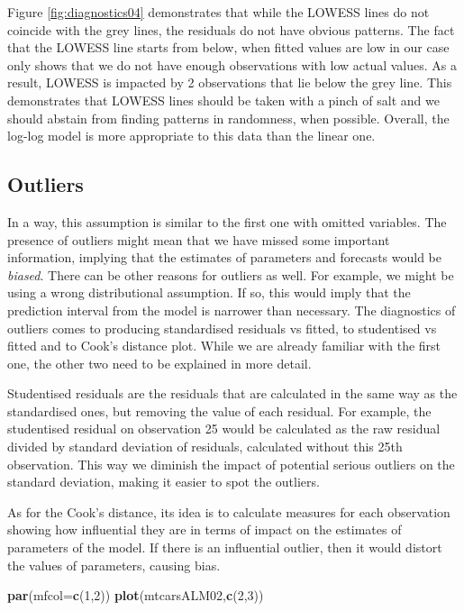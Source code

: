 \documentclass[
]{book}
\newenvironment{Shaded}{\begin{snugshade}}{\end{snugshade}}
\newcommand{\DataTypeTok}[1]{\textcolor[rgb]{0.13,0.29,0.53}{#1}}
\newcommand{\DecValTok}[1]{\textcolor[rgb]{0.00,0.00,0.81}{#1}}
\newcommand{\KeywordTok}[1]{\textcolor[rgb]{0.13,0.29,0.53}{\textbf{#1}}}
\newcommand{\NormalTok}[1]{#1}
\theoremstyle{definition}
\theoremstyle{definition}
\theoremstyle{definition}
\theoremstyle{definition}
\theoremstyle{remark}
\begin{document}
Figure \ref{fig:diagnostics04} demonstrates that while the LOWESS lines do not coincide with the grey lines, the residuals do not have obvious patterns. The fact that the LOWESS line starts from below, when fitted values are low in our case only shows that we do not have enough observations with low actual values. As a result, LOWESS is impacted by 2 observations that lie below the grey line. This demonstrates that LOWESS lines should be taken with a pinch of salt and we should abstain from finding patterns in randomness, when possible. Overall, the log-log model is more appropriate to this data than the linear one.

\hypertarget{assumptionsCorrectModelOutliers}{%
\subsection{Outliers}\label{assumptionsCorrectModelOutliers}}

In a way, this assumption is similar to the first one with omitted variables. The presence of outliers might mean that we have missed some important information, implying that the estimates of parameters and forecasts would be \emph{biased}. There can be other reasons for outliers as well. For example, we might be using a wrong distributional assumption. If so, this would imply that the prediction interval from the model is narrower than necessary. The diagnostics of outliers comes to producing standardised residuals vs fitted, to studentised vs fitted and to Cook's distance plot. While we are already familiar with the first one, the other two need to be explained in more detail.

Studentised residuals are the residuals that are calculated in the same way as the standardised ones, but removing the value of each residual. For example, the studentised residual on observation 25 would be calculated as the raw residual divided by standard deviation of residuals, calculated without this 25th observation. This way we diminish the impact of potential serious outliers on the standard deviation, making it easier to spot the outliers.

As for the Cook's distance, its idea is to calculate measures for each observation showing how influential they are in terms of impact on the estimates of parameters of the model. If there is an influential outlier, then it would distort the values of parameters, causing bias.

\begin{Shaded}
\begin{Highlighting}[]
\KeywordTok{par}\NormalTok{(}\DataTypeTok{mfcol=}\KeywordTok{c}\NormalTok{(}\DecValTok{1}\NormalTok{,}\DecValTok{2}\NormalTok{))}
\KeywordTok{plot}\NormalTok{(mtcarsALM02,}\KeywordTok{c}\NormalTok{(}\DecValTok{2}\NormalTok{,}\DecValTok{3}\NormalTok{))}
\end{Highlighting}
\end{Shaded}
\end{document}

